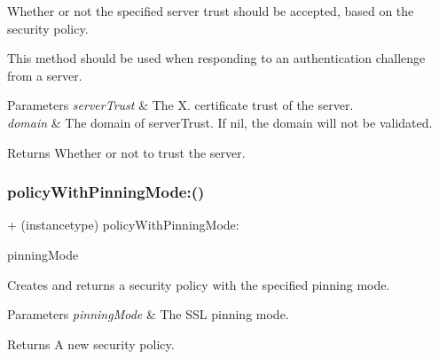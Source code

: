 Whether or not the specified server trust should be accepted, based on the security policy.

This method should be used when responding to an authentication challenge from a server.


\begin{DoxyParams}{Parameters}
{\em server\+Trust} & The X. certificate trust of the server. \\
\hline
{\em domain} & The domain of server\+Trust. If {\ttfamily nil}, the domain will not be validated.\\
\hline
\end{DoxyParams}
\begin{DoxyReturn}{Returns}
Whether or not to trust the server. 
\end{DoxyReturn}
\mbox{\label{interface_a_f_security_policy_a94c44f7101fa4d0954d0c63f72f1e9cd}} 
\subsubsection{\texorpdfstring{policy\+With\+Pinning\+Mode\+:()}{policyWithPinningMode:()}\hspace{0.1cm}{\footnotesize\ttfamily [1/3]}}
{\footnotesize\ttfamily + (instancetype) policy\+With\+Pinning\+Mode\+: \begin{DoxyParamCaption}\item[{(A\+F\+S\+S\+L\+Pinning\+Mode)}]{pinning\+Mode }\end{DoxyParamCaption}}

Creates and returns a security policy with the specified pinning mode.


\begin{DoxyParams}{Parameters}
{\em pinning\+Mode} & The S\+SL pinning mode.\\
\hline
\end{DoxyParams}
\begin{DoxyReturn}{Returns}
A new security policy. 
\end{DoxyReturn}
\mbox{\label{interface_a_f_security_policy_a94c44f7101fa4d0954d0c63f72f1e9cd}} 
